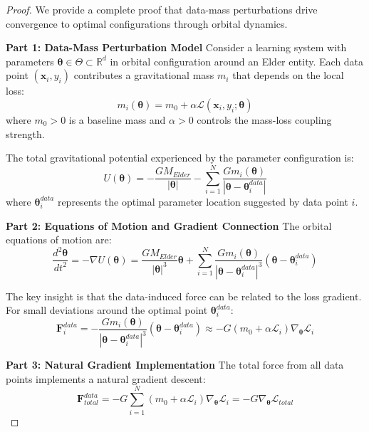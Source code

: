 \begin{proof}
We provide a complete proof that data-mass perturbations drive convergence to optimal configurations through orbital dynamics.

\textbf{Part 1: Data-Mass Perturbation Model}
Consider a learning system with parameters $\boldsymbol{\theta} \in \Theta \subset \mathbb{R}^d$ in orbital configuration around an Elder entity. Each data point $(\mathbf{x}_i, y_i)$ contributes a gravitational mass $m_i$ that depends on the local loss:
\begin{equation}
m_i(\boldsymbol{\theta}) = m_0 + \alpha \mathcal{L}(\mathbf{x}_i, y_i; \boldsymbol{\theta})
\end{equation}
where $m_0 > 0$ is a baseline mass and $\alpha > 0$ controls the mass-loss coupling strength.

The total gravitational potential experienced by the parameter configuration is:
\begin{equation}
U(\boldsymbol{\theta}) = -\frac{GM_{Elder}}{|\boldsymbol{\theta}|} - \sum_{i=1}^N \frac{G m_i(\boldsymbol{\theta})}{|\boldsymbol{\theta} - \boldsymbol{\theta}_i^{data}|}
\end{equation}
where $\boldsymbol{\theta}_i^{data}$ represents the optimal parameter location suggested by data point $i$.

\textbf{Part 2: Equations of Motion and Gradient Connection}
The orbital equations of motion are:
\begin{equation}
\frac{d^2\boldsymbol{\theta}}{dt^2} = -\nabla U(\boldsymbol{\theta}) = \frac{GM_{Elder}}{|\boldsymbol{\theta}|^3}\boldsymbol{\theta} + \sum_{i=1}^N \frac{G m_i(\boldsymbol{\theta})}{|\boldsymbol{\theta} - \boldsymbol{\theta}_i^{data}|^3}(\boldsymbol{\theta} - \boldsymbol{\theta}_i^{data})
\end{equation}

The key insight is that the data-induced force can be related to the loss gradient. For small deviations around the optimal point $\boldsymbol{\theta}_i^{data}$:
\begin{equation}
\mathbf{F}_i^{data} = -\frac{G m_i(\boldsymbol{\theta})}{|\boldsymbol{\theta} - \boldsymbol{\theta}_i^{data}|^3}(\boldsymbol{\theta} - \boldsymbol{\theta}_i^{data}) \approx -G(m_0 + \alpha \mathcal{L}_i) \nabla_{\boldsymbol{\theta}} \mathcal{L}_i
\end{equation}

\textbf{Part 3: Natural Gradient Implementation}
The total force from all data points implements a natural gradient descent:
\begin{equation}
\mathbf{F}_{total}^{data} = -G \sum_{i=1}^N (m_0 + \alpha \mathcal{L}_i) \nabla_{\boldsymbol{\theta}} \mathcal{L}_i = -G \nabla_{\boldsymbol{\theta}} \mathcal{L}_{total}
\end{equation}


\end{proof}
